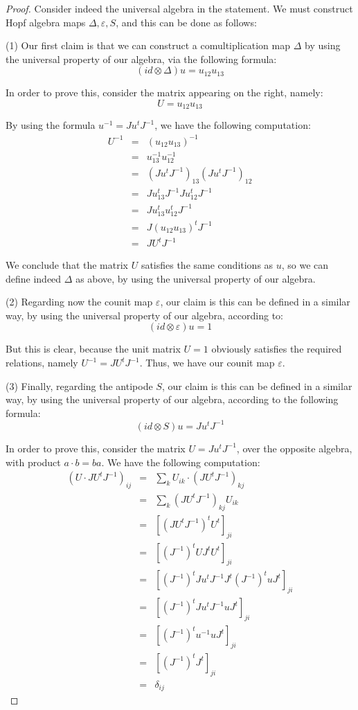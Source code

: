 \documentclass[12pt]{amsbook}
\begin{document}
\begin{proof}
Consider indeed the universal algebra in the statement. We must construct Hopf algebra maps $\Delta,\varepsilon,S$, and this can be done as follows:

\medskip

(1) Our first claim is that we can construct a comultiplication map $\Delta$ by using the universal property of our algebra, via the following formula:
$$(id\otimes\Delta)u=u_{12}u_{13}$$

In order to prove this, consider the matrix appearing on the right, namely:
$$U=u_{12}u_{13}$$

By using the formula $u^{-1}=Ju^tJ^{-1}$, we have the following computation:
\begin{eqnarray*}
U^{-1}
&=&(u_{12}u_{13})^{-1}\\
&=&u_{13}^{-1}u_{12}^{-1}\\
&=&(Ju^tJ^{-1})_{13}(Ju^tJ^{-1})_{12}\\
&=&Ju_{13}^tJ^{-1}Ju_{12}^tJ^{-1}\\
&=&Ju_{13}^tu_{12}^tJ^{-1}\\
&=&J(u_{12}u_{13})^tJ^{-1}\\
&=&JU^tJ^{-1}
\end{eqnarray*}

We conclude that the matrix $U$ satisfies the same conditions as $u$, so we can define indeed $\Delta$ as above, by using the universal property of our algebra.

\medskip

(2) Regarding now the counit map $\varepsilon$, our claim is this can be defined in a similar way, by using the universal property of our algebra, according to:
$$(id\otimes\varepsilon)u=1$$

But this is clear, because the unit matrix $U=1$ obviously satisfies the required relations, namely $U^{-1}=JU^tJ^{-1}$. Thus, we have our counit map $\varepsilon$.

\medskip

(3) Finally, regarding the antipode $S$, our claim is this can be defined in a similar way, by using the universal property of our algebra, according to the following formula:
$$(id\otimes S)u=Ju^tJ^{-1}$$

In order to prove this, consider the matrix $U=Ju^tJ^{-1}$, over the opposite algebra, with product $a\cdot b=ba$. We have the following computation:
\begin{eqnarray*}
(U\cdot JU^tJ^{-1})_{ij}
&=&\sum_kU_{ik}\cdot(JU^tJ^{-1})_{kj}\\
&=&\sum_k(JU^tJ^{-1})_{kj}U_{ik}\\
&=&[(JU^tJ^{-1})^tU^t]_{ji}\\
&=&[(J^{-1})^tUJ^tU^t]_{ji}\\
&=&[(J^{-1})^tJu^tJ^{-1}J^t(J^{-1})^tuJ^t]_{ji}\\
&=&[(J^{-1})^tJu^tJ^{-1}uJ^t]_{ji}\\
&=&[(J^{-1})^tu^{-1}uJ^t]_{ji}\\
&=&[(J^{-1})^tJ^t]_{ji}\\
&=&\delta_{ij}
\end{eqnarray*}


\end{proof}
\end{document}
